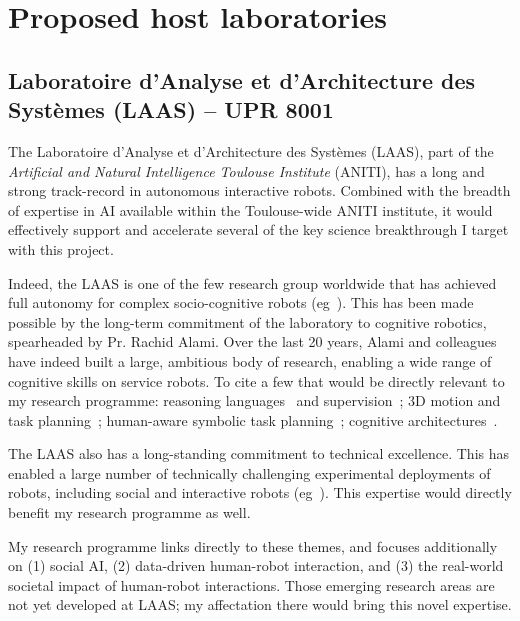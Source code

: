 \section{Proposed host laboratories}

\subsection{Laboratoire d'Analyse et d'Architecture des Systèmes (LAAS) -- UPR 8001}

The Laboratoire d'Analyse et d'Architecture des Systèmes (LAAS), part of the
\emph{Artificial and Natural Intelligence Toulouse Institute} (ANITI), has a
long and strong track-record in autonomous interactive robots. Combined with the
breadth of expertise in AI available within the Toulouse-wide ANITI institute,
it would effectively support and accelerate several of the key science
breakthrough I target with this project.

Indeed, the LAAS is one of the few research group worldwide that has achieved
full autonomy for complex socio-cognitive robots
(eg~\cite{lemaignan2017artificial}).  This has been made possible by the
long-term commitment of the laboratory to cognitive robotics, spearheaded by Pr.
Rachid Alami. Over the last 20 years, Alami and colleagues have indeed built a
large, ambitious body of research, enabling a wide range of cognitive skills on
service robots. To cite a few that would be directly relevant to my research
programme: reasoning languages~\autocite{Ingrand1996} and
supervision~\autocite{Clodic2009}; 3D motion and task
planning~\autocite{Sisbot2008, Mainprice2011}; human-aware symbolic task
planning~\autocite{alami2005task,Alili2008,Lallement2014,milliez2016using};
cognitive architectures~\autocite{devin2016implemented}.

The LAAS also has a long-standing commitment to technical excellence. This has
enabled a large number of technically challenging experimental deployments of
robots, including social and interactive robots (eg~\autocite{alami2005task}).
This expertise would directly benefit my research programme as well.

My research programme links directly to these themes, and focuses additionally
on (1) social AI, (2) data-driven human-robot interaction, and (3) the
real-world societal impact of human-robot interactions. Those emerging research
areas are not yet developed at LAAS; my affectation there would bring this novel
expertise.

